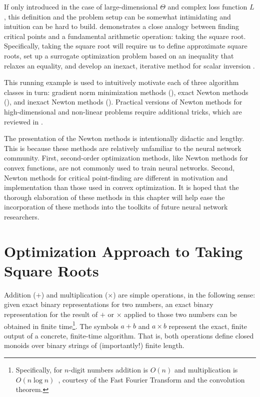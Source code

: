 \documentclass[../../thesis.tex]{subfiles}
\begin{document}
If only introduced in the case of large-dimensional $\Theta$
and complex loss function $L$,
this definition and the problem setup can be somewhat intimidating
and intuition can be hard to build.
 demonstrates a close analogy
between finding critical points
and a fundamental arithmetic operation:
taking the square root.
Specifically,
taking the square root will require us to define
approximate square roots,
set up a surrogate optimization problem based
on an inequality that relaxes an equality,
and develop an inexact, iterative method for scalar inversion%
.

This running example is used to intuitively motivate
each of three algorithm classes in turn:
gradient norm minimization methods (),
exact Newton methods (),
and inexact Newton methods ().
Practical versions of Newton methods
for high-dimensional and non-linear problems
require additional tricks,
which are reviewed in .

The presentation of the Newton methods
is intentionally didactic and lengthy.
This is because these methods are relatively unfamiliar
to the neural network community.
First,
second-order optimization methods,
like Newton methods for convex functions,
are not commonly used to train neural networks.
Second,
Newton methods for critical point-finding
are different in motivation
and implementation than those used in
convex optimization.
It is hoped that the
thorough elaboration of these methods
in this chapter will help ease
the incorporation of these methods
into the toolkits of future neural network researchers.

\section{Optimization Approach to Taking Square Roots}

Addition ($+$) and multiplication ($\times$)
are simple operations, in the following sense:
given exact binary representations for two numbers,
an exact binary representation for the result of $+$ or $\times$
applied to those two numbers can be obtained in finite time\footnote{%
Specifically, for $n$-digit numbers addition is $O(n)$ and
multiplication is $O(n\log n)$~\cite{harvey2019},
courtesy of the Fast Fourier Transform and the convolution theorem.}.
The symbols $a + b$ and $a \times b$ represent the exact, finite output
of a concrete, finite-time algorithm.
That is, both operations define closed monoids over
binary strings of
(importantly!) finite length.
\end{document}
